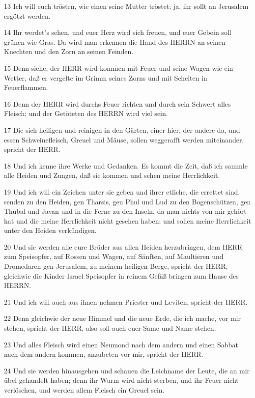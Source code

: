 \par 13 Ich will euch trösten, wie einen seine Mutter tröstet; ja, ihr sollt an Jerusalem ergötzt werden.
\par 14 Ihr werdet's sehen, und euer Herz wird sich freuen, und euer Gebein soll grünen wie Gras. Da wird man erkennen die Hand des HERRN an seinen Knechten und den Zorn an seinen Feinden.
\par 15 Denn siehe, der HERR wird kommen mit Feuer und seine Wagen wie ein Wetter, daß er vergelte im Grimm seines Zorns und mit Schelten in Feuerflammen.
\par 16 Denn der HERR wird durchs Feuer richten und durch sein Schwert alles Fleisch; und der Getöteten des HERRN wird viel sein.
\par 17 Die sich heiligen und reinigen in den Gärten, einer hier, der andere da, und essen Schweinefleisch, Greuel und Mäuse, sollen weggerafft werden miteinander, spricht der HERR.
\par 18 Und ich kenne ihre Werke und Gedanken. Es kommt die Zeit, daß ich sammle alle Heiden und Zungen, daß sie kommen und sehen meine Herrlichkeit.
\par 19 Und ich will ein Zeichen unter sie geben und ihrer etliche, die errettet sind, senden zu den Heiden, gen Tharsis, gen Phul und Lud zu den Bogenschützen, gen Thubal und Javan und in die Ferne zu den Inseln, da man nichts von mir gehört hat und die meine Herrlichkeit nicht gesehen haben; und sollen meine Herrlichkeit unter den Heiden verkündigen.
\par 20 Und sie werden alle eure Brüder aus allen Heiden herzubringen, dem HERR zum Speisopfer, auf Rossen und Wagen, auf Sänften, auf Maultieren und Dromedaren gen Jerusalem, zu meinem heiligen Berge, spricht der HERR, gleichwie die Kinder Israel Speisopfer in reinem Gefäß bringen zum Hause des HERRN.
\par 21 Und ich will auch aus ihnen nehmen Priester und Leviten, spricht der HERR.
\par 22 Denn gleichwie der neue Himmel und die neue Erde, die ich mache, vor mir stehen, spricht der HERR, also soll auch euer Same und Name stehen.
\par 23 Und alles Fleisch wird einen Neumond nach dem andern und einen Sabbat nach dem andern kommen, anzubeten vor mir, spricht der HERR.
\par 24 Und sie werden hinausgehen und schauen die Leichname der Leute, die an mir übel gehandelt haben; denn ihr Wurm wird nicht sterben, und ihr Feuer nicht verlöschen, und werden allem Fleisch ein Greuel sein.

